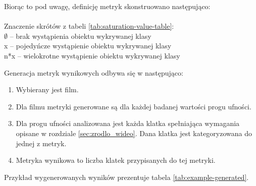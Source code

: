 Biorąc to pod uwagę, definicję metryk skonstruowano następująco: \\ \\ \noindent
Znaczenie skrótów z tabeli \ref{tab:saturation-value-table}: \\
$\emptyset$ -- brak wystąpienia obiektu wykrywanej klasy \\
x -- pojedyńcze wystąpienie obiektu wykrywanej klasy \\
n*x -- wielokrotne wystąpienie obiektu wykrywanej klasy


Generacja metryk wynikowych odbywa się w następująco:
\begin{enumerate}
    \item Wybierany jest film.
    \item Dla filmu metryki generowane są dla każdej badanej wartości progu ufności.
    \item Dla progu ufności analizowana jest każda klatka spełniająca wymagania opisane w rozdziale \ref{sec:zrodlo_wideo}. Dana klatka jest kategoryzowana do jednej z metryk.
    \item Metryka wynikowa to liczba klatek przypisanych do tej metryki.
\end{enumerate} 
Przykład wygenerowanych wyników prezentuje tabela \ref{tab:example-generated}.

